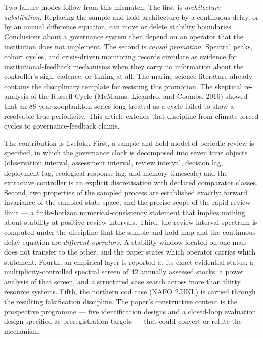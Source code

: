 \documentclass[11pt]{article}
\begin{document}
Two failure modes follow from this mismatch. The first is
\emph{architecture substitution}. Replacing the sample-and-hold
architecture by a continuous delay, or by an annual difference equation,
can move or delete stability boundaries. Conclusions about a governance
system then depend on an operator that the institution does not
implement. The second is \emph{causal promotion}. Spectral peaks, cohort
cycles, and crisis-driven monitoring records circulate as evidence for
institutional-feedback mechanisms when they carry no information about
the controller's sign, cadence, or timing at all. The marine-science
literature already contains the disciplinary template for resisting this
promotion. The skeptical re-analysis of the Russell Cycle (McManus,
Licandro, and Coombs, 2016) showed that an 88-year zooplankton series
long treated as a cycle failed to show a resolvable true periodicity.
This article extends that discipline from climate-forced cycles to
governance-feedback claims.

The contribution is fivefold. First, a sample-and-hold model of periodic
review is specified, in which the governance clock is decomposed into
seven time objects (observation interval, assessment interval, review
interval, decision lag, deployment lag, ecological response lag, and
memory timescale) and the extractive controller is an explicit
discretisation with declared comparator classes. Second, two properties
of the sampled process are established exactly: forward invariance of
the sampled state space, and the precise scope of the rapid-review limit
--- a finite-horizon numerical-consistency statement that implies
nothing about stability at positive review intervals. Third, the
review-interval spectrum is computed under the discipline that the
sample-and-hold map and the continuous-delay equation are
\emph{different operators}. A stability window located on one map does
not transfer to the other, and the paper states which operator carries
which statement. Fourth, an empirical layer is reported at its exact
evidential status: a multiplicity-controlled spectral screen of 42
annually assessed stocks, a power analysis of that screen, and a
structured case search across more than thirty resource systems. Fifth,
the northern cod case (NAFO 2J3KL) is carried through the resulting
falsification discipline. The paper's constructive content is the
prospective programme --- five identification designs and a closed-loop
evaluation design specified as preregistration targets --- that could
convert or refute the mechanism.
\end{document}
